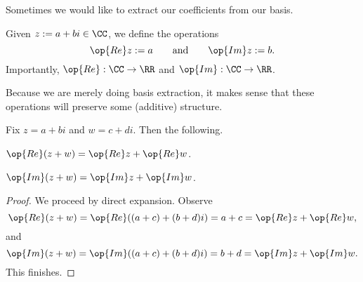 Sometimes we would like to extract our coefficients from our basis.
\begin{definition}
	Given $z:=a+bi\in\CC$, we define the operations
	\[\op{Re}z:=a\qquad\text{and}\qquad\op{Im}z:=b.\]
	Importantly, $\op{Re}:\CC\to\RR$ and $\op{Im}:\CC\to\RR$.
\end{definition}
Because we are merely doing basis extraction, it makes sense that these operations will preserve some (additive) structure.
\begin{proposition}
	Fix $z=a+bi$ and $w=c+di$. Then the following.
	\begin{listalph}
		\item $\op{Re}(z+w)=\op{Re}z+\op{Re}w$.
		\item $\op{Im}(z+w)=\op{Im}z+\op{Im}w$.
	\end{listalph}
\end{proposition}
\begin{proof}
	We proceed by direct expansion. Observe
	\[\op{Re}(z+w)=\op{Re}((a+c)+(b+d)i)=a+c=\op{Re}z+\op{Re}w,\]
	and
	\[\op{Im}(z+w)=\op{Im}((a+c)+(b+d)i)=b+d=\op{Im}z+\op{Im}w.\]
	This finishes.
\end{proof}

